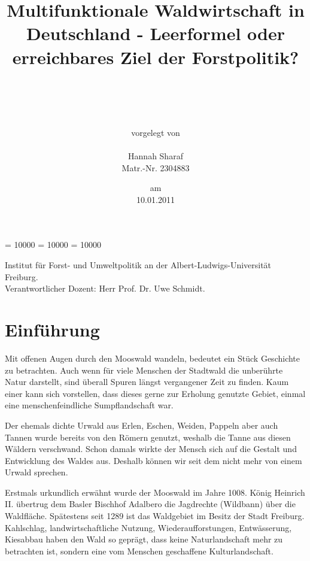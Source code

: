 \documentclass[12pt]{article}
\begin{document}
\clubpenalty = 10000
\widowpenalty = 10000 
\displaywidowpenalty = 10000

\onehalfspacing 


\begin{titlepage}

\title{Multifunktionale Waldwirtschaft in Deutschland - Leerformel oder erreichbares Ziel der Forstpolitik?}
\author{\\ \\ \\ \\ vorgelegt von \\ \\ Hannah Sharaf \\ Matr.-Nr. 2304883}
\date{am \\ 10.01.2011}
\maketitle
\vfill {\noindent Institut für Forst- und Umweltpolitik an der Albert-Ludwigs-Universität Freiburg. \\ Verantwortlicher Dozent: Herr Prof. Dr. Uwe Schmidt.}
\thispagestyle{empty}
\newpage

\end{titlepage} 


\section*{Einführung}
Mit offenen Augen durch den Mooswald wandeln, bedeutet ein Stück Geschichte zu betrachten.
Auch wenn für viele Menschen der Stadtwald die unberührte Natur darstellt, sind überall Spuren
längst vergangener Zeit zu finden. Kaum einer kann sich vorstellen, dass dieses gerne zur
Erholung genutzte Gebiet, einmal eine menschenfeindliche Sumpflandschaft war.

Der ehemals dichte Urwald aus Erlen, Eschen, Weiden, Pappeln aber auch Tannen wurde bereits von den
Römern genutzt, weshalb die Tanne aus diesen Wäldern verschwand. Schon damals wirkte der Mensch
sich auf die Gestalt und Entwicklung des Waldes aus. Deshalb können wir seit dem nicht mehr von
einem Urwald sprechen.

Erstmals urkundlich erwähnt wurde der Mooswald im Jahre 1008. König Heinrich II. übertrug dem Basler
Bischhof Adalbero die Jagdrechte (Wildbann) über die Waldfläche. Spätestens seit 1289 ist das Waldgebiet
im Besitz der Stadt Freiburg. Kahlschlag, landwirtschaftliche Nutzung, Wiederaufforstungen, Entwässerung, 
Kiesabbau haben den Wald so geprägt, dass keine Naturlandschaft mehr zu betrachten ist, sondern eine vom 
Menschen geschaffene Kulturlandschaft.
\end{document}
